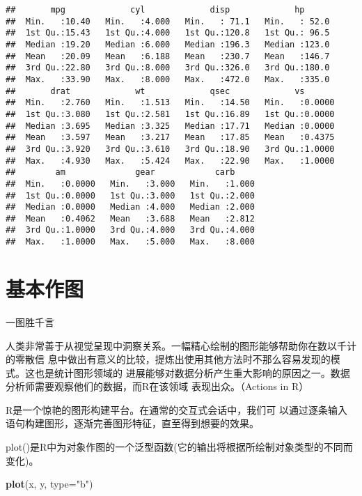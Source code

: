 \documentclass[]{book}
\newenvironment{Shaded}{\begin{snugshade}}{\end{snugshade}}
\newcommand{\DataTypeTok}[1]{\textcolor[rgb]{0.13,0.29,0.53}{#1}}
\newcommand{\KeywordTok}[1]{\textcolor[rgb]{0.13,0.29,0.53}{\textbf{#1}}}
\newcommand{\NormalTok}[1]{#1}
\newcommand{\StringTok}[1]{\textcolor[rgb]{0.31,0.60,0.02}{#1}}
\begin{document}
\begin{verbatim}
##       mpg             cyl             disp             hp       
##  Min.   :10.40   Min.   :4.000   Min.   : 71.1   Min.   : 52.0  
##  1st Qu.:15.43   1st Qu.:4.000   1st Qu.:120.8   1st Qu.: 96.5  
##  Median :19.20   Median :6.000   Median :196.3   Median :123.0  
##  Mean   :20.09   Mean   :6.188   Mean   :230.7   Mean   :146.7  
##  3rd Qu.:22.80   3rd Qu.:8.000   3rd Qu.:326.0   3rd Qu.:180.0  
##  Max.   :33.90   Max.   :8.000   Max.   :472.0   Max.   :335.0  
##       drat             wt             qsec             vs        
##  Min.   :2.760   Min.   :1.513   Min.   :14.50   Min.   :0.0000  
##  1st Qu.:3.080   1st Qu.:2.581   1st Qu.:16.89   1st Qu.:0.0000  
##  Median :3.695   Median :3.325   Median :17.71   Median :0.0000  
##  Mean   :3.597   Mean   :3.217   Mean   :17.85   Mean   :0.4375  
##  3rd Qu.:3.920   3rd Qu.:3.610   3rd Qu.:18.90   3rd Qu.:1.0000  
##  Max.   :4.930   Max.   :5.424   Max.   :22.90   Max.   :1.0000  
##        am              gear            carb      
##  Min.   :0.0000   Min.   :3.000   Min.   :1.000  
##  1st Qu.:0.0000   1st Qu.:3.000   1st Qu.:2.000  
##  Median :0.0000   Median :4.000   Median :2.000  
##  Mean   :0.4062   Mean   :3.688   Mean   :2.812  
##  3rd Qu.:1.0000   3rd Qu.:4.000   3rd Qu.:4.000  
##  Max.   :1.0000   Max.   :5.000   Max.   :8.000
\end{verbatim}

\section{基本作图}

一图胜千言

人类非常善于从视觉呈现中洞察关系。一幅精心绘制的图形能够帮助你在数以千计的零散信
息中做出有意义的比较，提炼出使用其他方法时不那么容易发现的模式。这也是统计图形领域的
进展能够对数据分析产生重大影响的原因之一。数据分析师需要观察他们的数据，而R在该领域
表现出众。（Actions in R）

R是一个惊艳的图形构建平台。在通常的交互式会话中，我们可
以通过逐条输入语句构建图形，逐渐完善图形特征，直至得到想要的效果。

plot()是R中为对象作图的一个泛型函数(它的输出将根据所绘制对象类型的不同而变化)。

\begin{Shaded}
\begin{Highlighting}[]
\KeywordTok{plot}\NormalTok{(x, y, }\DataTypeTok{type=}\StringTok{"b"}\NormalTok{)}
\end{Highlighting}
\end{Shaded}
\end{document}
